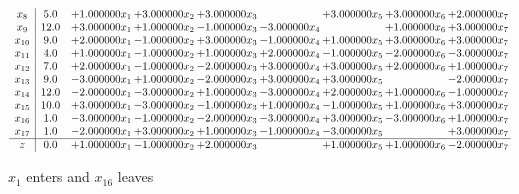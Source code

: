 \documentclass[10pt]{article}
\begin{document}
\[\begin{array}{c| c c@{\hskip 2pt} c@{\hskip 2pt} c@{\hskip 2pt} c@{\hskip 2pt} c@{\hskip 2pt} c@{\hskip 2pt} c@{\hskip 2pt} }
 x_{8}   &  5.0 & + 1.000000 x_{1} & + 3.000000 x_{2} & + 3.000000 x_{3} &   & + 3.000000 x_{5} & + 3.000000 x_{6} & + 2.000000 x_{7}\\
 x_{9}   &  12.0 & + 3.000000 x_{1} & + 1.000000 x_{2} & -1.000000 x_{3} & -3.000000 x_{4} &   & + 1.000000 x_{6} & + 3.000000 x_{7}\\
 x_{10}   &  9.0 & + 2.000000 x_{1} & -1.000000 x_{2} & + 3.000000 x_{3} & -1.000000 x_{4} & + 1.000000 x_{5} & + 3.000000 x_{6} & + 3.000000 x_{7}\\
 x_{11}   &  4.0 & + 1.000000 x_{1} & -1.000000 x_{2} & + 1.000000 x_{3} & + 2.000000 x_{4} & -1.000000 x_{5} & -2.000000 x_{6} & -3.000000 x_{7}\\
 x_{12}   &  7.0 & + 2.000000 x_{1} & -1.000000 x_{2} & -2.000000 x_{3} & + 3.000000 x_{4} & + 3.000000 x_{5} & + 2.000000 x_{6} & + 1.000000 x_{7}\\
 x_{13}   &  9.0 & -3.000000 x_{1} & + 1.000000 x_{2} & -2.000000 x_{3} & + 3.000000 x_{4} & + 3.000000 x_{5} &   & -2.000000 x_{7}\\
 x_{14}   &  12.0 & -2.000000 x_{1} & -3.000000 x_{2} & + 1.000000 x_{3} & -3.000000 x_{4} & + 2.000000 x_{5} & + 1.000000 x_{6} & -1.000000 x_{7}\\
 x_{15}   &  10.0 & + 3.000000 x_{1} & -3.000000 x_{2} & -1.000000 x_{3} & + 1.000000 x_{4} & -1.000000 x_{5} & + 1.000000 x_{6} & + 3.000000 x_{7}\\
 x_{16}   &  1.0 & -3.000000 x_{1} & -1.000000 x_{2} & -2.000000 x_{3} & -3.000000 x_{4} & + 3.000000 x_{5} & -3.000000 x_{6} & + 1.000000 x_{7}\\
 x_{17}   &  1.0 & -2.000000 x_{1} & + 3.000000 x_{2} & + 1.000000 x_{3} & -1.000000 x_{4} & -3.000000 x_{5} &   & + 3.000000 x_{7}\\
\hline
z    &  0.0 & + 1.000000 x_{1} & -1.000000 x_{2} & + 2.000000 x_{3} &   & + 1.000000 x_{5} & + 1.000000 x_{6} & -2.000000 x_{7}\\
\end{array}\]


 $ x_{1} $ enters and $ x_{16} $ leaves 
\end{document}
